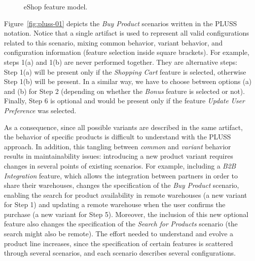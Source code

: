 \documentclass{sig-alt-full}
\begin{document}
\begin{figure}[th]
\begin{center}

\caption{eShop feature model.}
\label{fig:eshop-fm}
\end{center}
\end{figure} 





Figure~\ref{fig:pluss-01} depicts the \emph{Buy Product} scenarios written in
the PLUSS notation. Notice that a single artifact is used to represent all valid
configurations related to this scenario, mixing common behavior, variant
behavior, and configuration information (feature selection inside square
brackets). For example, steps 1(a) and 1(b) are never performed together. They
are alternative steps: Step 1(a) will be present only if the \emph{Shopping
Cart} feature is selected, otherwise Step 1(b) will be present. In a similar
way, we have to choose between options (a) and (b) for Step 2 (depending
on whether the \emph{Bonus} feature is selected or not). Finally, Step 6 is
optional and would be present only if the feature \emph{Update User Preference} was selected.

As a consequence, since all possible variants are described in the same
artifact, the behavior of specific products is difficult to understand with the
PLUSS approach. In addition, this tangling between \emph{common} and
\emph{variant} behavior results in maintainability issues: introducing a new product variant
requires changes in several points of existing scenarios. For example, including a
\emph{B2B Integration} feature, which allows the integration between partners in
order to share their warehouses, changes the specification of the \emph{Buy
Product} scenario, enabling the search for product availability in remote
warehouses (a new variant for Step 1) and updating a remote warehouse when the
user confirms the purchase (a new variant for Step 5). Moreover, the inclusion of
this new optional feature also changes the specification of the \emph{Search for
Products} scenario (the search might also be remote). The effort
needed to understand and evolve a product line increases, since the
specification of certain features is scattered through several scenarios,
and each scenario describes several configurations.
\end{document}
